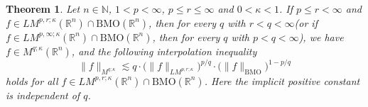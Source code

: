 \documentclass{birkjour}
\newtheorem{thm}{Theorem}[section]
\theoremstyle{definition}
\theoremstyle{remark}
\numberwithin{equation}{section}
\begin{document}
\begin{thm}\label{weak}
Let $n\in \mathbb{N}$, $1<p<\infty$, $p\leq r\leq\infty$ and $0<\kappa<1$. If $p\leq r<\infty$ and $f\in LM^{p,r;\kappa}(\mathbb R^n)\cap \mathrm{BMO}(\mathbb R^n)$, then for every $q$ with $r<q<\infty$(or if $f\in LM^{p,\infty;\kappa}(\mathbb R^n)\cap \mathrm{BMO}(\mathbb R^n)$, then for every $q$ with $p<q<\infty$), we have $f\in M^{q;\kappa}(\mathbb R^n)$, and the following interpolation inequality
\begin{equation*}
\|f\|_{M^{q;\kappa}}\lesssim q\cdot\big(\|f\|_{LM^{p,r;\kappa}}\big)^{p/q}\cdot\big(\|f\|_{\mathrm{BMO}}\big)^{1-p/q}
\end{equation*}
holds for all $f\in LM^{p,r;\kappa}(\mathbb R^n)\cap{\mathrm{BMO}}(\mathbb R^n)$. Here the implicit positive constant is independent of $q$.
\end{thm}
\end{document}
